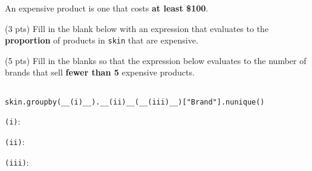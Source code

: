 \documentclass[twoside,12pt]{article}
\begin{document}
\begin{probset}

\begin{prob}

\vspace{0.1in}

An expensive product is one that costs \textbf{at least \$100}.


\begin{subprobset}

\begin{subprob}(3 pts) Fill in the blank below with an expression that evaluates to the \textbf{proportion} of products in \texttt{skin} that are expensive.

\biginlineresponsebox[6in]{}

\end{subprob}

\vspace{0.2in}

\begin{subprob}(5 pts) Fill in the blanks so that the expression below evaluates to the number of brands that sell \textbf{fewer than 5} expensive products.

\begin{verbatim}

skin.groupby(__(i)__).__(ii)__(__(iii)__)["Brand"].nunique()

\end{verbatim}

\texttt{(i)}: 


\texttt{(ii)}: 





\texttt{(iii)}: \biginlineresponsebox[6in]{}

\end{subprob}




\end{subprobset}
\end{prob}
\end{probset}
\end{document}
